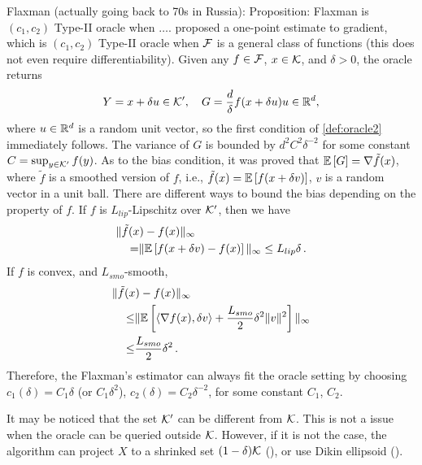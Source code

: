 Flaxman (actually going back to 70s in Russia): 
Proposition:  Flaxman is $(c_1,c_2)$ Type-II oracle when $\dots$. 
\cite{flaxman2005online} proposed a one-point estimate to gradient, which is $(c_1,c_2)$ Type-II oracle when $\mathcal{F}$ is a general class of functions (this does not even require differentiability).
Given any $f \in \mathcal{F}$, $x \in \mathcal{K}$, and $\delta >0$, the oracle returns 
\[
 Y = x+\delta u \in \mathcal{K}', \quad
 G = \dfrac{d}{\delta}f(x+\delta u)u \in \mathbb{R}^d,
\]
where $u\in \mathbb{R}^d$ is a random unit vector, so the first condition of \cref{def:oracle2} immediately follows.
The variance of $G$ is bounded by $d^2C^2 \delta^{-2}$ for some constant $C = \sup_{y\in \mathcal{K}'}f(y)$.
 As to the bias condition, it was proved that $\mathbb{E}\left[G\right] = \nabla \tilde{f}(x)$, where $\tilde{f}$ is a smoothed version of $f$, i.e.,
$\tilde{f}(x) = \mathbb{E}\left[f(x+\delta v)\right]$,
$v$ is a random vector in a unit ball. There are different ways to bound the bias depending on the property of $f$.
If $f$ is $L_{lip}$-Lipschitz over $\mathcal{K}'$, then we have
\begin{align*}
\MoveEqLeft
\norm{\tilde{f}(x)-f(x)}_\infty \\
=&\norm{\EE{f(x+\delta v)-f(x)}}_\infty
\le L_{lip} \delta \,.
\end{align*}
If $f$ is convex, and $L_{smo}$-smooth, 
\begin{align*}
\MoveEqLeft
\norm{\tilde{f}(x)-f(x)}_\infty \\
\le& \norm{\EE{\ip{\nabla f(x), \delta v}+\dfrac{L_{smo}}{2}\delta^2\norm{v}^2}}_\infty\\
\le &\dfrac{L_{smo}}{2}\delta^2 \,.
\end{align*}
Therefore, the Flaxman's estimator can always fit the oracle setting by choosing $c_1(\delta) = C_1 \delta$ (or $C_1\delta^2$), $c_2(\delta) = C_2 \delta^{-2}$, for some constant $C_1$, $C_2$.

It may be noticed that the set $\mathcal{K}'$ can be different from $\mathcal{K}$. This is not a issue when the oracle can be queried outside $\mathcal{K}$. However, if it is not the case, the algorithm can project $X$ to a shrinked set $(1-\delta)\mathcal{K}$ (\cite{flaxman2005online}), or use Dikin ellipsoid (\cite{AbHaRa08}).


